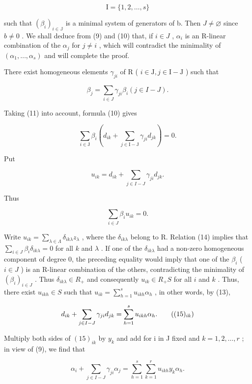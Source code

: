 \[
\mathrm{I} = \{1, 2, \dots , s \}
\]

such that \((\beta_{i})_{i\in\mathbb{J}}\) is a minimal system of generators of b. Then \(J\neq\varnothing\) since \(b\neq0\) . We shall deduce from (9) and (10) that, if \(i\in J\) , \(\alpha_{i}\) is an R-linear combination of the \(\alpha_{j}\) for \(j\neq i\) , which will contradict the minimality of \((\alpha_{1},\ldots,\alpha_{s})\) and will complete the proof.

There exist homogeneous elements \(\gamma_{ji}\) of R ( \(i \in \mathrm{J}, j \in \mathrm{I} - \mathrm{J}\) ) such that

\[
\beta_ {j} = \sum_ {i \in J} \gamma_ {j i} \beta_ {i} (j \in I - J).\tag{11}
\]

Taking (11) into account, formula (10) gives

\[
\sum_ {i \in \mathrm{J}} \beta_ {i} \left(d _ {i k} + \sum_ {j \in \mathrm{I} - \mathrm{J}} \gamma_ {j i} d _ {j k}\right) = 0.\tag{12}
\]

Put

\[
u _ {i k} = d _ {i k} + \sum_ {j \in I - J} \gamma_ {j i} d _ {j k}.\tag{13}
\]

Thus

\[
\sum_ {i \in J} \beta_ {i} u _ {i k} = 0.\tag{14}
\]

Write \(u_{ik} = \sum_{\lambda \in \Lambda} \delta_{ik\lambda} z_\lambda\) , where the \(\delta_{ik\lambda}\) belong to R. Relation (14) implies that \(\sum_{i \in J} \beta_i \delta_{ik\lambda} = 0\) for all \(k\) and \(\lambda\) . If one of the \(\delta_{ik\lambda}\) had a non-zero homogeneous component of degree 0, the preceding equality would imply that one of the \(\beta_i\) ( \(i \in J\) ) is an R-linear combination of the others, contradicting the minimality of \((\beta_i)_{i \in J}\) . Thus \(\delta_{ik\lambda} \in R_+\) and consequently \(u_{ik} \in R_+ S\) for all \(i\) and \(k\) . Thus, there exist \(u_{ikh} \in S\) such that \(u_{ik} = \sum_{h=1}^{s} u_{ikh} \alpha_h\) , in other words, by (13),

\[
d _ {i k} + \sum_ {j \in I - J} \gamma_ {j i} d _ {j k} = \sum_ {h = 1} ^ {s} u _ {i k h} \alpha_ {h}.\tag{$(15)_{ik}$}
\]

Multiply both sides of \((15)_{ik}\) by \(y_{k}\) and add for i in J fixed and \(k = 1, 2, \ldots, r\) ; in view of (9), we find that

\[
\alpha_ {i} + \sum_ {j \in I - J} \gamma_ {j i} \alpha_ {j} = \sum_ {h = 1} ^ {s} \sum_ {k = 1} ^ {r} u _ {i k h} y _ {k} \alpha_ {h}.
\]

